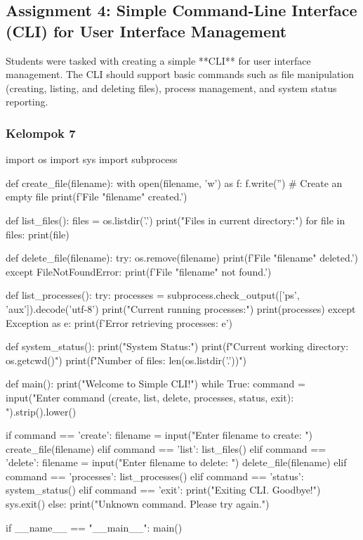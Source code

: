 \documentclass[12pt]{article}
\begin{document}
\subsection{Assignment 4: Simple Command-Line Interface (CLI) for User Interface Management}
Students were tasked with creating a simple **CLI** for user interface management. The CLI should support basic commands such as file manipulation (creating, listing, and deleting files), process management, and system status reporting.

\subsubsection{Kelompok 7}

\begin{python}
import os
import sys
import subprocess

def create_file(filename):
    with open(filename, 'w') as f:
        f.write('')  # Create an empty file
    print(f'File "{filename}" created.')

def list_files():
    files = os.listdir('.')
    print("Files in current directory:")
    for file in files:
        print(file)

def delete_file(filename):
    try:
        os.remove(filename)
        print(f'File "{filename}" deleted.')
    except FileNotFoundError:
        print(f'File "{filename}" not found.')

def list_processes():
    try:
        processes = subprocess.check_output(['ps', 'aux']).decode('utf-8')
        print("Current running processes:")
        print(processes)
    except Exception as e:
        print(f'Error retrieving processes: {e}')

def system_status():
    print("System Status:")
    print(f"Current working directory: {os.getcwd()}")
    print(f"Number of files: {len(os.listdir('.'))}")

def main():
    print("Welcome to Simple CLI!")
    while True:
        command = input("Enter command (create, list, delete, processes, status, exit): ").strip().lower()
        
        if command == 'create':
            filename = input("Enter filename to create: ")
            create_file(filename)
        elif command == 'list':
            list_files()
        elif command == 'delete':
            filename = input("Enter filename to delete: ")
            delete_file(filename)
        elif command == 'processes':
            list_processes()
        elif command == 'status':
            system_status()
        elif command == 'exit':
            print("Exiting CLI. Goodbye!")
            sys.exit()
        else:
            print("Unknown command. Please try again.")

if __name__ == "__main__":
    main()
\end{python}
\end{document}

